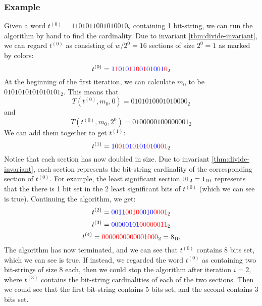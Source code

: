\subsubsection{Example}
Given a word $t^{(0)}=1101011001010010_2$ containing 1 bit-string, we can run the algorithm by hand to find the cardinality. Due to invariant \ref{thm:divide-invariant}, we can regard $t^{(0)}$ as consisting of $w/2^0=16$ sections of size $2^0=1$ as marked by colors:\\
$$t^{(0)}=\color{blue}1\color{red}1\color{blue}0\color{red}1\color{blue}0\color{red}1\color{blue}1\color{red}0\color{blue}0\color{red}1\color{blue}0\color{red}1\color{blue}0\color{red}0\color{blue}1\color{red}0_{\color{black}2}$$
At the beginning of the first iteration, we can calculate $m_0$ to be $0101010101010101_2$. This means that 
$$T(t^{(0)}, m_0, 0)=0101010001010000_2$$ 
and $$T(t^{(0)}, m_0, 2^0)=0100000100000001_2$$
We can add them together to get $t^{(1)}$:
$$t^{(1)}=\color{blue}10\color{red}01\color{blue}01\color{red}01\color{blue}01\color{red}01\color{blue}00\color{red}01_{\color{black}2}$$
Notice that each section has now doubled in size. Due to invariant \ref{thm:divide-invariant}, each section represents the bit-string cardinality of the corresponding section of $t^{(0)}$. For example, the least significant section $\color{red}01\color{black}_2 = 1_{10}$ represents that the there is 1 bit set in the 2 least significant bits of $t^{(0)}$ (which we can see is true). Continuing the algorithm, we get:
$$t^{(2)}=\color{blue}0011\color{red}0010\color{blue}0010\color{red}0001\color{black}_2$$
$$t^{(3)}=\color{blue}00000101\color{red}00000011\color{black}_2$$
$$t^{(4)}=\color{red}0000000000001000\color{black}_2 = 8_{10}$$
The algorithm has now terminated, and we can see that $t^{(0)}$ contains 8 bits set, which we can see is true.
If instead, we regarded the word $t^{(0)}$ as containing two bit-strings of size $8$ each, then we could stop the algorithm after iteration $i=2$, where $t^{(3)}$ contains the bit-string cardinalities of each of the two sections. Then we could see that the first bit-string contains 5 bits set, and the second contains 3 bits set.

% 
